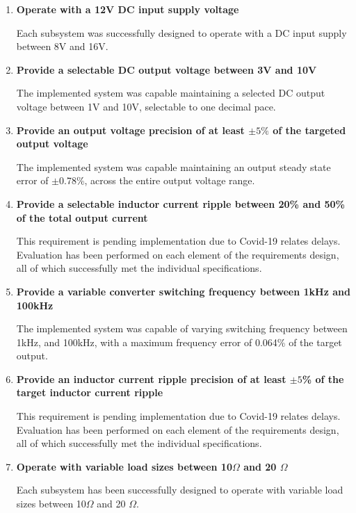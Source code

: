 \begin{enumerate}
    \item \textbf{Operate with a 12V DC input supply voltage}

    Each subsystem was successfully designed to operate with a DC input supply between 8V and 16V. 

    \item \textbf{Provide a selectable DC output voltage between 3V and 10V}

    The implemented system was capable maintaining a selected DC output voltage between 1V and 10V, selectable to one decimal pace. 

    \item \textbf{Provide an output voltage precision of at least $\pm5\%$ of the targeted output voltage}

    The implemented system was capable maintaining an output steady state error of $\pm$0.78\%, across the entire output voltage range.

    \newpage
    \item \textbf{Provide a selectable inductor current ripple between 20\% and 50\% of the total output current}

    This requirement is pending implementation due to Covid-19 relates delays. Evaluation has been performed on each element of the requirements design, all of which successfully met the individual specifications.

    \item \textbf{Provide a variable converter switching frequency between 1kHz and 100kHz}

    The implemented system was capable of varying switching frequency between 1kHz, and 100kHz, with a maximum frequency error of 0.064\% of the target output.

    \item \textbf{Provide an inductor current ripple precision of at least $\pm5$\% of the target inductor current ripple }

    This requirement is pending implementation due to Covid-19 relates delays. Evaluation has been performed on each element of the requirements design, all of which successfully met the individual specifications.

    \item \textbf{Operate with variable load sizes between 10$\Omega$ and 20 $\Omega$}

    Each subsystem has been successfully designed to operate with variable load sizes between 10$\Omega$ and 20 $\Omega$.

\end{enumerate}



